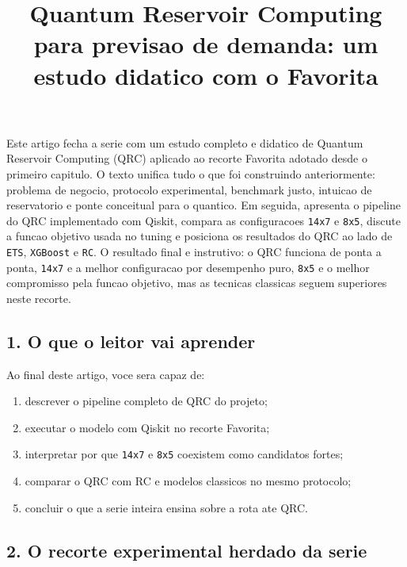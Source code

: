 \documentclass[12pt]{article}
\title{Quantum Reservoir Computing para previsao de demanda: um estudo didatico com o Favorita}
\author{}
\providecommand{\tightlist}{%
          \setlength{\itemsep}{0pt}\setlength{\parskip}{0pt}}
\begin{document}
        \maketitle

        \begin{resumo}
        Este artigo fecha a serie com um estudo completo e didatico de Quantum Reservoir Computing (QRC) aplicado ao recorte Favorita adotado desde o primeiro capitulo. O texto unifica tudo o que foi construindo anteriormente: problema de negocio, protocolo experimental, benchmark justo, intuicao de reservatorio e ponte conceitual para o quantico. Em seguida, apresenta o pipeline do QRC implementado com Qiskit, compara as configuracoes \texttt{14x7} e \texttt{8x5}, discute a funcao objetivo usada no tuning e posiciona os resultados do QRC ao lado de \texttt{ETS}, \texttt{XGBoost} e \texttt{RC}. O resultado final e instrutivo: o QRC funciona de ponta a ponta, \texttt{14x7} e a melhor configuracao por desempenho puro, \texttt{8x5} e o melhor compromisso pela funcao objetivo, mas as tecnicas classicas seguem superiores neste recorte.
        \end{resumo}

        \subsection{1. O que o leitor vai aprender}\label{1-o-que-o-leitor-vai-aprender}

Ao final deste artigo, voce sera capaz de:

\begin{enumerate}
\def\labelenumi{\arabic{enumi}.}
\tightlist
\item
  descrever o pipeline completo de QRC do projeto;
\item
  executar o modelo com Qiskit no recorte Favorita;
\item
  interpretar por que \texttt{14x7} e \texttt{8x5} coexistem como candidatos fortes;
\item
  comparar o QRC com RC e modelos classicos no mesmo protocolo;
\item
  concluir o que a serie inteira ensina sobre a rota ate QRC.
\end{enumerate}

\subsection{2. O recorte experimental herdado da serie}\label{2-o-recorte-experimental-herdado-da-serie}
\end{document}
